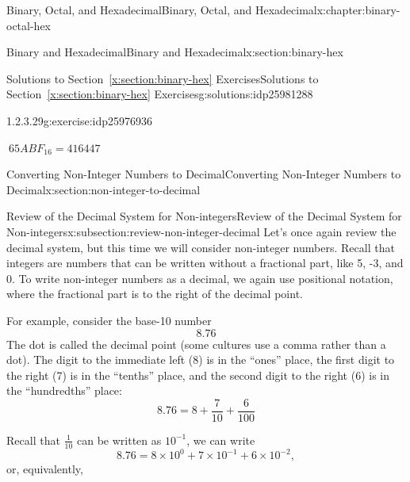 \documentclass[twoside,10pt,]{book}
\newcommand{\xreffont}{\relax}
\numberwithin{equation}{section}
\begin{document}
\begin{chapterptx}{Binary, Octal, and Hexadecimal}{}{Binary, Octal, and Hexadecimal}{}{}{x:chapter:binary-octal-hex}
\begin{sectionptx}{Binary and Hexadecimal}{}{Binary and Hexadecimal}{}{}{x:section:binary-hex}
\begin{solutions-subsection}{Solutions to Section~{\xreffont\ref*{x:section:binary-hex}} Exercises}{}{Solutions to Section~{\xreffont\ref*{x:section:binary-hex}} Exercises}{}{}{g:solutions:idp25981288}
\begin{exercisegroup}
\begin{divisionsolutioneg}{1.2.3.29}{}{g:exercise:idp25976936}%
\par\smallskip%
\noindent\hypertarget{g:solution:idp25980392-main}{}\(\ 65ABF_{16}=416447\)\end{divisionsolutioneg}%
\end{exercisegroup}
\par\medskip\noindent
\end{solutions-subsection}
\end{sectionptx}
%
%
\typeout{************************************************}
\typeout{************************************************}
%
\begin{sectionptx}{Converting Non-Integer Numbers to Decimal}{}{Converting Non-Integer Numbers to Decimal}{}{}{x:section:non-integer-to-decimal}
%
%
\typeout{************************************************}
\typeout{************************************************}
%
\begin{subsectionptx}{Review of the Decimal System for Non-integers}{}{Review of the Decimal System for Non-integers}{}{}{x:subsection:review-non-integer-decimal}
Let's once again review the decimal system, but this time we will consider non-integer numbers.  Recall that integers are numbers that can be written without a fractional part, like 5, -3, and 0.  To write non-integer numbers as a decimal, we again use positional notation, where the fractional part is to the right of the decimal point.%
\par
For example, consider the base-10 number%
\begin{equation*}
8.76
\end{equation*}
The dot is called the decimal point (some cultures use a comma rather than a dot).  The digit to the immediate left (8) is in the ``ones'' place, the first digit to the right (7) is in the ``tenths'' place, and the second digit to the right (6) is in the ``hundredths'' place:%
\begin{equation*}
8.76=8+\frac{7}{10}+\frac{6}{100}
\end{equation*}
%
\par
Recall that \(\tfrac{1}{10}\) can be written as \(10^{-1}\), we can write%
\begin{equation*}
8.76=8\times10^0+7\times10^{-1}+6\times10^{-2},
\end{equation*}
or, equivalently,%
\begin{equation*}

\end{equation*}
\end{subsectionptx}
\end{sectionptx}
\end{chapterptx}
\end{document}
